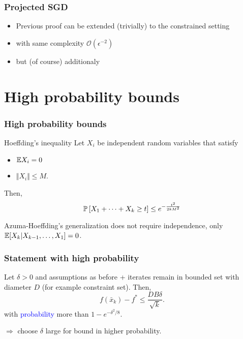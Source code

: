 \documentclass[aspectratio=149]{beamer}
\begin{document}
\begin{frame}
  \frametitle{Projected SGD}

  \begin{itemize}
    \item Previous proof can be extended (trivially) to the constrained setting
    \item with same complexity $\mathcal{O}(\epsilon^{-2})$
    \item but (of course) additionaly
  \end{itemize}

\end{frame}

\section{High probability bounds}%
\label{sec:}

\begin{frame}
  \frametitle{High probability bounds}

  \begin{theorem}{Hoeffding's inequality}
    Let $X_i$ be independent random variables that satisfy
    \begin{itemize}
      \item $\E X_i = 0$
      \item $\Vert X_i \Vert \le M$.
    \end{itemize}
    Then,
    \begin{equation}
      \P\left[ X_1+ \dots + X_k \ge t\right] \le e^{-\frac{t^2}{2kM^2}}
    \end{equation}
  \end{theorem}

  Azuma-Hoeffding's generalization does not require independence, only $\E[X_k| X_{k-1}, \dots, X_1]=0$.
\end{frame}


\begin{frame}
  \frametitle{Statement with high probability}
  \begin{theorem}
    Let $\delta>0$ and assumptions as before + iterates remain in bounded set with diameter $D$ (for example constraint set). Then,
    \begin{equation}
       f(\bar{x}_k) - f^* \le \frac{D B \delta}{\sqrt{k}}.
    \end{equation}
    with \textcolor{blue}{probability} more than $1-e^{-\delta^2/8}$.
  \end{theorem}
  $\Rightarrow$ choose $\delta$ large for bound in higher probability.
\end{frame}
\end{document}
